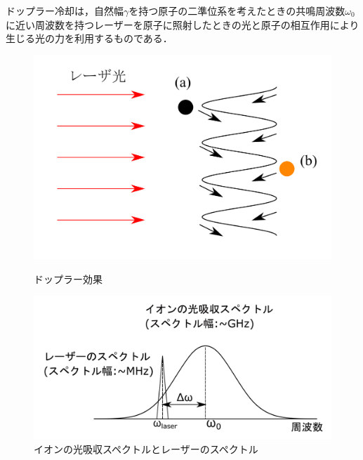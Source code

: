 ドップラー冷却は，自然幅$\gamma$を持つ原子の二準位系を考えたときの共鳴周波数$\omega_0$に近い周波数を持つレーザーを原子に照射したときの光と原子の相互作用により生じる光の力を利用するものである．

\begin{figure}[h]
	\begin{minipage}{0.5\linewidth}
		\begin{center}
			\includegraphics[width = 0.98\columnwidth]{./theory/figure/DopplerEffect.png}
			\caption{ドップラー効果}
			\label{fig:DopplerEffect}
		\end{center}
	\end{minipage}
	\begin{minipage}{0.5\linewidth}
			\begin{center}
				\includegraphics[width = 0.98\columnwidth]{./theory/figure/cooling_spectrum.png}
				\caption{イオンの光吸収スペクトルとレーザーのスペクトル}
				\label{fig:cooling_spectrum}
			\end{center}
		\end{minipage}
\end{figure}

